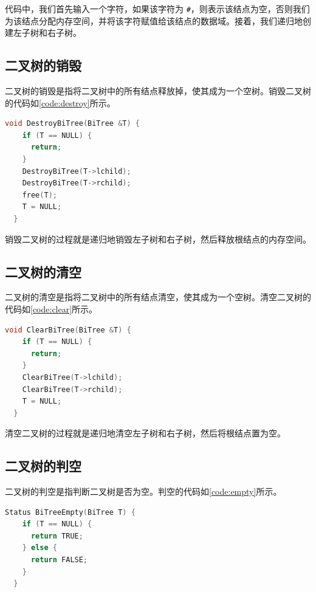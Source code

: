 \documentclass[lang=cn,newtx,10pt,scheme=chinese]{elegantbook}
\begin{document}
代码中，我们首先输入一个字符，如果该字符为 \texttt{\#}，则表示该结点为空，否则我们为该结点分配内存空间，并将该字符赋值给该结点的数据域。接着，我们递归地创建左子树和右子树。

\subsection{二叉树的销毁}

二叉树的销毁是指将二叉树中的所有结点释放掉，使其成为一个空树。销毁二叉树的代码如\ref{code:destroy}所示。

\begin{lstlisting}[language=C++, caption={销毁二叉树}, label={code:destroy}]
  void DestroyBiTree(BiTree &T) {
    if (T == NULL) {
      return;
    }
    DestroyBiTree(T->lchild);
    DestroyBiTree(T->rchild);
    free(T);
    T = NULL;
  }
\end{lstlisting}

销毁二叉树的过程就是递归地销毁左子树和右子树，然后释放根结点的内存空间。

\subsection{二叉树的清空}

二叉树的清空是指将二叉树中的所有结点清空，使其成为一个空树。清空二叉树的代码如\ref{code:clear}所示。

\begin{lstlisting}[language=C++, caption={清空二叉树}, label={code:clear}]
  void ClearBiTree(BiTree &T) {
    if (T == NULL) {
      return;
    }
    ClearBiTree(T->lchild);
    ClearBiTree(T->rchild);
    T = NULL;
  }

\end{lstlisting}

清空二叉树的过程就是递归地清空左子树和右子树，然后将根结点置为空。

\subsection{二叉树的判空}

二叉树的判空是指判断二叉树是否为空。判空的代码如\ref{code:empty}所示。

\begin{lstlisting}[language=C++, caption={判空}, label={code:empty}]
  Status BiTreeEmpty(BiTree T) {
    if (T == NULL) {
      return TRUE;
    } else {
      return FALSE;
    }
  }

\end{lstlisting}
\end{document}
